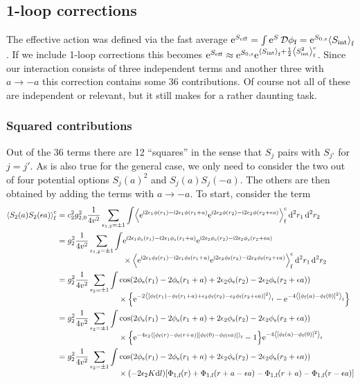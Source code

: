 \documentclass[english, parskip=full]{scrartcl}
\begin{document}
\subsection{1-loop corrections}
The effective action was defined via the fast average $\powe{S_\text{eff}} = \int \powe{S}\,\mathcal{D}\phi_\f = \powe{S_{0,\s}} \bra*{S_\text{int}}_\f$.
If we include 1-loop corrections this becomes $\powe{S_\text{eff}} \approx \powe{S_{0,\s}} \powe{\bra*{S_\text{int}}_\f + \frac{1}{2} \bra*{S_\text{int}^2}_\f^\c}$.
Since our interaction consists of three independent terms and another three with $a\rightarrow -a$ this correction contains some 36 contributions.
Of course not all of these are independent or relevant, but it still makes for a rather daunting task.
\subsubsection{Squared contributions}
Out of the 36 terms there are 12 ``squares'' in the sense that $S_j$ pairs with $S_{j'}$ for $j=j'$.
As is also true for the general case, we only need to consider the two out of four potential options $S_j(a)^2$ and $S_j(a)S_j(-a)$.
The others are then obtained by adding the terms with $a\rightarrow -a$.
To start, consider the term
\begin{align}
\bra*{S_2(a) S_2(\epsilon a)}_\f^\c &= c_2^2g_{2,0}^2 \frac{1}{4v^2} \sum_{\epsilon_{1,2}=\pm 1} \int \bra*{ \powe{\i 2\epsilon_1\phi(r_1) - \i 2\epsilon_1\phi(r_1+a)} \powe{\i 2\epsilon_2\phi(r_2) - \i 2\epsilon_2\phi(r_2+\epsilon a)} }_\f^\c \,\d^2r_1\,\d^2r_2\\
&= g_2^2 \frac{1}{4v^2} \sum_{\epsilon_{1,2}=\pm 1} \bsplit{\int &\powe{\i 2\epsilon_1\phi_\s(r_1) - \i 2\epsilon_1\phi_\s(r_1+a)} \powe{\i 2\epsilon_2\phi_\s(r_2) - \i 2\epsilon_2\phi_\s(r_2+\epsilon a)} \\
&\times\bra*{ \powe{\i 2\epsilon_1\phi_\f(r_1) - \i 2\epsilon_1\phi_\f(r_1+a)} \powe{\i 2\epsilon_2\phi_\f(r_2) - \i 2\epsilon_2\phi_\f(r_2+\epsilon a)} }_\f^\c \,\d^2r_1\,\d^2r_2}\\
&= g_2^2 \frac{1}{4v^2} \sum_{\epsilon_2=\pm 1} \bsplit{\int  &\cos\kla*{2\phi_\s(r_1) - 2\phi_\s(r_1+a) + 2\epsilon_2\phi_\s(r_2) - 2\epsilon_2\phi_\s(r_2+\epsilon a)}\\
&\times \klc*{\powe{-2 \bra*{\klb*{\phi_\f(r_1) - \phi_\f(r_1+a) + \epsilon_2 \phi_\f(r_2) - \epsilon_2\phi_\f(r_2+\epsilon a)}^2}_\f} - \powe{-4\bra*{\klb*{\phi_\f(a) - \phi_\f(0)}^2}_\f}} }\\
&= g_2^2 \frac{1}{4v^2} \sum_{\epsilon_2=\pm 1} \bsplit{\int  &\cos\kla*{2\phi_\s(r_1) - 2\phi_\s(r_1+a) + 2\epsilon_2\phi_\s(r_2) - 2\epsilon_2\phi_\s(r_2+\epsilon a)}\\
&\times \klc*{\powe{-4 \epsilon_2 \bra*{\klb*{\phi_\f(r) - \phi_\f(r+a)} \klb*{\phi_\f(0) - \phi_\f(\epsilon a)}}_\f} - 1} \powe{-4\bra*{\klb*{\phi_\f(a) - \phi_\f(0)}^2}_\f}}\\
&= g_2^2 \frac{1}{4v^2} \sum_{\epsilon_2=\pm 1} \bsplit{\int  &\cos\kla*{2\phi_\s(r_1) - 2\phi_\s(r_1+a) + 2\epsilon_2\phi_\s(r_2) - 2\epsilon_2\phi_\s(r_2+\epsilon a)}\\
&\times (-2 \epsilon_2 K\d l) \klb*{\Phi_{1,\f}(r) + \Phi_{1,\f}(r+a-\epsilon a) - \Phi_{1,\f}(r+a) - \Phi_{1,\f}(r-\epsilon a)}}
\end{align}
\end{document}
